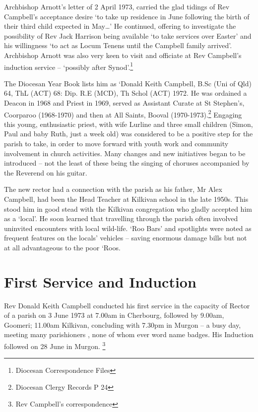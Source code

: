 Archbishop Arnott's letter of 2 April 1973, carried the glad tidings of
Rev Campbell's acceptance desire `to take up residence in June following
the birth of their third child expected in May\ldots' He continued,
offering to investigate the possibility of Rev Jack Harrison being
available `to take services over Easter' and his willingness `to act as
Locum Tenens until the Campbell family arrived'. Archbishop Arnott was
also very keen to visit and officiate at Rev Campbell's induction
service -- `possibly after Synod'.\footnote{Diocesan Correspondence
  Files}

The Diocesan Year Book lists him as `Donald Keith Campbell, B.Sc (Uni of
Qld) 64, ThL (ACT) 68: Dip. R.E (MCD), Th Schol (ACT) 1972. He was
ordained a Deacon in 1968 and Priest in 1969, served as Assistant Curate
at St Stephen's, Coorparoo (1968-1970) and then at All Saints, Booval
(1970-1973).\footnote{Diocesan Clergy Records P 24} Engaging this young,
enthusiastic priest, with wife Lurline and three small children (Simon,
Paul and baby Ruth, just a week old) was considered to be a positive
step for the parish to take, in order to move forward with youth work
and community involvement in church activities. Many changes and new
initiatives began to be introduced -- not the least of these being the
singing of choruses accompanied by the Reverend on his guitar.

The new rector had a connection with the parish as his father, Mr Alex
Campbell, had been the Head Teacher at Kilkivan school in the late
1950s. This stood him in good stead with the Kilkivan congregation who
gladly accepted him as a `local'. He soon learned that travelling
through the parish often involved uninvited encounters with local
wild-life. `Roo Bars' and spotlights were noted as frequent features on
the locals' vehicles -- saving enormous damage bills but not at all
advantageous to the poor `Roos.

\section{First Service and
Induction}

Rev Donald Keith Campbell conducted his first service in the capacity of
Rector of a parish on 3 June 1973 at 7.00am in Cherbourg, followed by
9.00am, Goomeri; 11.00am Kilkivan, concluding with 7.30pm in Murgon -- a
busy day, meeting many parishioners , none of whom ever word name
badges. His Induction followed on 28 June in Murgon. \footnote{Rev
  Campbell's correspondence}


